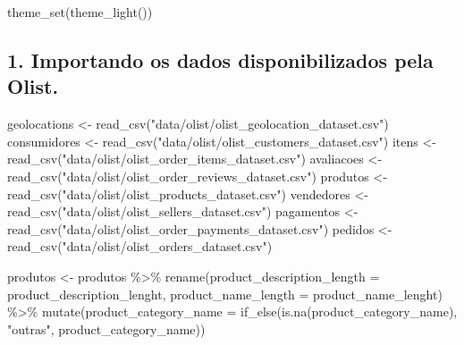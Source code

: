 \documentclass[
]{article}
\newenvironment{Shaded}{\begin{snugshade}}{\end{snugshade}}
\newcommand{\AttributeTok}[1]{\textcolor[rgb]{0.77,0.63,0.00}{#1}}
\newcommand{\FunctionTok}[1]{\textcolor[rgb]{0.00,0.00,0.00}{#1}}
\newcommand{\NormalTok}[1]{#1}
\newcommand{\OtherTok}[1]{\textcolor[rgb]{0.56,0.35,0.01}{#1}}
\newcommand{\SpecialCharTok}[1]{\textcolor[rgb]{0.00,0.00,0.00}{#1}}
\newcommand{\StringTok}[1]{\textcolor[rgb]{0.31,0.60,0.02}{#1}}
\begin{document}
\begin{Shaded}
\begin{Highlighting}[]
\FunctionTok{theme\_set}\NormalTok{(}\FunctionTok{theme\_light}\NormalTok{())}
\end{Highlighting}
\end{Shaded}

\hypertarget{importando-os-dados-disponibilizados-pela-olist.}{%
\subsection{1. Importando os dados disponibilizados pela
Olist.}\label{importando-os-dados-disponibilizados-pela-olist.}}

\begin{Shaded}
\begin{Highlighting}[]
\NormalTok{geolocations }\OtherTok{\textless{}{-}} \FunctionTok{read\_csv}\NormalTok{(}\StringTok{"data/olist/olist\_geolocation\_dataset.csv"}\NormalTok{)}
\NormalTok{consumidores }\OtherTok{\textless{}{-}} \FunctionTok{read\_csv}\NormalTok{(}\StringTok{"data/olist/olist\_customers\_dataset.csv"}\NormalTok{)}
\NormalTok{itens }\OtherTok{\textless{}{-}} \FunctionTok{read\_csv}\NormalTok{(}\StringTok{"data/olist/olist\_order\_items\_dataset.csv"}\NormalTok{)}
\NormalTok{avaliacoes }\OtherTok{\textless{}{-}} \FunctionTok{read\_csv}\NormalTok{(}\StringTok{"data/olist/olist\_order\_reviews\_dataset.csv"}\NormalTok{)}
\NormalTok{produtos }\OtherTok{\textless{}{-}} \FunctionTok{read\_csv}\NormalTok{(}\StringTok{"data/olist/olist\_products\_dataset.csv"}\NormalTok{)}
\NormalTok{vendedores }\OtherTok{\textless{}{-}} \FunctionTok{read\_csv}\NormalTok{(}\StringTok{"data/olist/olist\_sellers\_dataset.csv"}\NormalTok{)}
\NormalTok{pagamentos }\OtherTok{\textless{}{-}} \FunctionTok{read\_csv}\NormalTok{(}\StringTok{"data/olist/olist\_order\_payments\_dataset.csv"}\NormalTok{)}
\NormalTok{pedidos }\OtherTok{\textless{}{-}} \FunctionTok{read\_csv}\NormalTok{(}\StringTok{"data/olist/olist\_orders\_dataset.csv"}\NormalTok{)}

\NormalTok{produtos }\OtherTok{\textless{}{-}}\NormalTok{ produtos }\SpecialCharTok{\%\textgreater{}\%}
  \FunctionTok{rename}\NormalTok{(}\AttributeTok{product\_description\_length =}\NormalTok{ product\_description\_lenght,}
         \AttributeTok{product\_name\_length =}\NormalTok{ product\_name\_lenght) }\SpecialCharTok{\%\textgreater{}\%}
  \FunctionTok{mutate}\NormalTok{(}\AttributeTok{product\_category\_name =} \FunctionTok{if\_else}\NormalTok{(}\FunctionTok{is.na}\NormalTok{(product\_category\_name), }\StringTok{"outras"}\NormalTok{, product\_category\_name))}
\end{Highlighting}
\end{Shaded}
\end{document}
